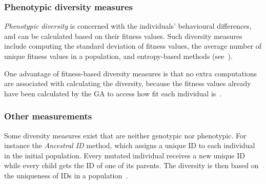 \subsubsection{Phenotypic diversity measures}
\emph{Phenotypic diversity} is concerned with the individuals' behavioural differences, and can be calculated based on their fitness values. Such diversity measures include computing the standard deviation of fitness values, the average number of unique fitness values in a population, and entropy-based methods (see~\cite{1250187, 1266373}).

One advantage of fitness-based diversity measures is that no extra computations are associated with calculating the diversity, because the fitness values already have been calculated by the GA to access how fit each individual is~\cite{Nguyen:2006:ASPGP}.

\subsubsection{Other measurements}
Some diversity measures exist that are neither genotypic nor phenotypic. For instance the \emph{Ancestral ID} method, which assigns a unique ID to each individual in the initial population. Every mutated individual receives a new unique ID while every child gets the ID of one of its parents. The diversity is then based on the uniqueness of IDs in a population~\cite{1250187}.

